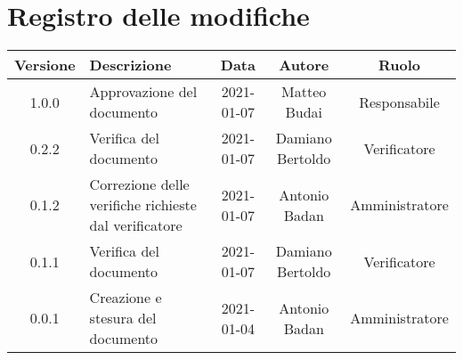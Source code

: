 \section*{Registro delle modifiche}

\begin{center}
	\begin{longtable}{|c|p{5cm}|c|c|c|}
	\hline
	\rowcolor{lighter-grayer}
	\textbf{Versione} & \textbf{Descrizione} & \textbf{Data} & \textbf{Autore} & \textbf{Ruolo} \\
	\hline
	\endfirsthead


	\hline
	1.0.0 & Approvazione del documento & 2021-01-07 & Matteo Budai & Responsabile \\
	\hline
	0.2.2 & Verifica del documento & 2021-01-07 & Damiano Bertoldo & Verificatore \\
	\hline
	0.1.2 & Correzione delle verifiche richieste dal verificatore  & 2021-01-07 & Antonio Badan & Amministratore \\
	\hline
	0.1.1 & Verifica del documento & 2021-01-07 & Damiano Bertoldo & Verificatore \\
	\hline
	0.0.1 & Creazione e stesura del documento & 2021-01-04 & Antonio Badan & Amministratore \\
	\hline
	\end{longtable}
\end{center}